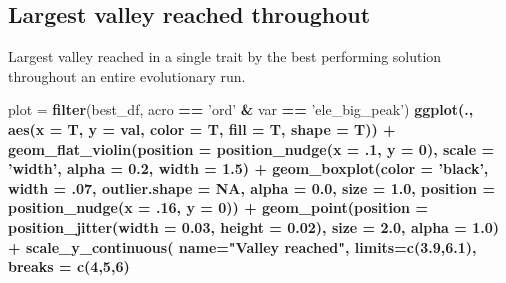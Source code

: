 \documentclass[]{book}
\newenvironment{Shaded}{\begin{snugshade}}{\end{snugshade}}
\newcommand{\DataTypeTok}[1]{\textcolor[rgb]{0.13,0.29,0.53}{#1}}
\newcommand{\DecValTok}[1]{\textcolor[rgb]{0.00,0.00,0.81}{#1}}
\newcommand{\FloatTok}[1]{\textcolor[rgb]{0.00,0.00,0.81}{#1}}
\newcommand{\KeywordTok}[1]{\textcolor[rgb]{0.13,0.29,0.53}{\textbf{#1}}}
\newcommand{\NormalTok}[1]{#1}
\newcommand{\OperatorTok}[1]{\textcolor[rgb]{0.81,0.36,0.00}{\textbf{#1}}}
\newcommand{\OtherTok}[1]{\textcolor[rgb]{0.56,0.35,0.01}{#1}}
\newcommand{\StringTok}[1]{\textcolor[rgb]{0.31,0.60,0.02}{#1}}
\begin{document}
\hypertarget{largest-valley-reached-throughout-5}{%
\subsection{Largest valley reached throughout}\label{largest-valley-reached-throughout-5}}

Largest valley reached in a single trait by the best performing solution throughout an entire evolutionary run.

\begin{Shaded}
\begin{Highlighting}[]
\NormalTok{plot =}\StringTok{ }\KeywordTok{filter}\NormalTok{(best_df, acro }\OperatorTok{==}\StringTok{ 'ord'} \OperatorTok{&}\StringTok{ }\NormalTok{var }\OperatorTok{==}\StringTok{ 'ele_big_peak'}\NormalTok{) }\OperatorTok{%>%}
\StringTok{  }\KeywordTok{ggplot}\NormalTok{(., }\KeywordTok{aes}\NormalTok{(}\DataTypeTok{x =}\NormalTok{ T, }\DataTypeTok{y =}\NormalTok{ val, }\DataTypeTok{color =}\NormalTok{ T, }\DataTypeTok{fill =}\NormalTok{ T, }\DataTypeTok{shape =}\NormalTok{ T)) }\OperatorTok{+}
\StringTok{  }\KeywordTok{geom_flat_violin}\NormalTok{(}\DataTypeTok{position =} \KeywordTok{position_nudge}\NormalTok{(}\DataTypeTok{x =} \FloatTok{.1}\NormalTok{, }\DataTypeTok{y =} \DecValTok{0}\NormalTok{), }\DataTypeTok{scale =} \StringTok{'width'}\NormalTok{, }\DataTypeTok{alpha =} \FloatTok{0.2}\NormalTok{, }\DataTypeTok{width =} \FloatTok{1.5}\NormalTok{) }\OperatorTok{+}
\StringTok{  }\KeywordTok{geom_boxplot}\NormalTok{(}\DataTypeTok{color =} \StringTok{'black'}\NormalTok{, }\DataTypeTok{width =} \FloatTok{.07}\NormalTok{, }\DataTypeTok{outlier.shape =} \OtherTok{NA}\NormalTok{, }\DataTypeTok{alpha =} \FloatTok{0.0}\NormalTok{, }\DataTypeTok{size =} \FloatTok{1.0}\NormalTok{, }\DataTypeTok{position =} \KeywordTok{position_nudge}\NormalTok{(}\DataTypeTok{x =} \FloatTok{.16}\NormalTok{, }\DataTypeTok{y =} \DecValTok{0}\NormalTok{)) }\OperatorTok{+}
\StringTok{  }\KeywordTok{geom_point}\NormalTok{(}\DataTypeTok{position =} \KeywordTok{position_jitter}\NormalTok{(}\DataTypeTok{width =} \FloatTok{0.03}\NormalTok{, }\DataTypeTok{height =} \FloatTok{0.02}\NormalTok{), }\DataTypeTok{size =} \FloatTok{2.0}\NormalTok{, }\DataTypeTok{alpha =} \FloatTok{1.0}\NormalTok{) }\OperatorTok{+}
\StringTok{  }\KeywordTok{scale_y_continuous}\NormalTok{(}
    \DataTypeTok{name=}\StringTok{"Valley reached"}\NormalTok{,}
    \DataTypeTok{limits=}\KeywordTok{c}\NormalTok{(}\FloatTok{3.9}\NormalTok{,}\FloatTok{6.1}\NormalTok{),}
    \DataTypeTok{breaks =} \KeywordTok{c}\NormalTok{(}\DecValTok{4}\NormalTok{,}\DecValTok{5}\NormalTok{,}\DecValTok{6}\NormalTok{)}
}
\end{Highlighting}
\end{Shaded}
\end{document}
